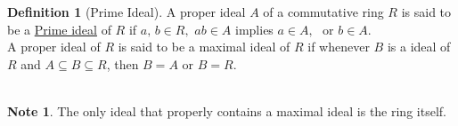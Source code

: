 \documentclass[11pt,a4paper]{article}
\theoremstyle{definition}
\newtheorem{defn}[thm]{Definition}
\newtheorem*{note}{Note}
\begin{document}
\begin{defn}[Prime Ideal]
A proper ideal $A$ of a commutative ring $R$ is said to be a \underline{Prime ideal} of $R$ if $a,\, b\in R,\,\, ab\in A$ implies $a\in A,\,\,$ or $ b\in A$.\\
A proper ideal of $R$ is said to be a maximal ideal of $R$ if whenever $B$ is a ideal of $R$ and $A\subseteq B\subseteq R$, then $B = A$ or $B = R$.\\\\
\end{defn}



\begin{note}
The only ideal that properly contains a maximal ideal is the ring itself.\\\\\
\end{note}
\end{document}
